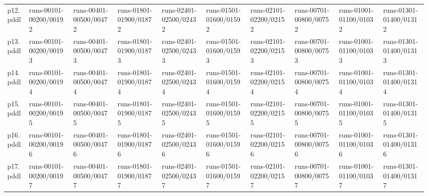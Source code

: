 \documentclass{article}
\begin{document}
\begin{tabular}{@{}lrrrrrrrrr@{}}
p12.pddl & \multicolumn{1}{|l|}{runs-00101-00200/00192} & \multicolumn{1}{|l|}{runs-00401-00500/00472} & \multicolumn{1}{|l|}{runs-01801-01900/01872} & \multicolumn{1}{|l|}{runs-02401-02500/02432} & \multicolumn{1}{|l|}{runs-01501-01600/01592} & \multicolumn{1}{|l|}{runs-02101-02200/02152} & \multicolumn{1}{|l|}{runs-00701-00800/00752} & \multicolumn{1}{|l|}{runs-01001-01100/01032} & \multicolumn{1}{|l|}{runs-01301-01400/01312} \\
p13.pddl & \multicolumn{1}{|l|}{runs-00101-00200/00193} & \multicolumn{1}{|l|}{runs-00401-00500/00473} & \multicolumn{1}{|l|}{runs-01801-01900/01873} & \multicolumn{1}{|l|}{runs-02401-02500/02433} & \multicolumn{1}{|l|}{runs-01501-01600/01593} & \multicolumn{1}{|l|}{runs-02101-02200/02153} & \multicolumn{1}{|l|}{runs-00701-00800/00753} & \multicolumn{1}{|l|}{runs-01001-01100/01033} & \multicolumn{1}{|l|}{runs-01301-01400/01313} \\
p14.pddl & \multicolumn{1}{|l|}{runs-00101-00200/00194} & \multicolumn{1}{|l|}{runs-00401-00500/00474} & \multicolumn{1}{|l|}{runs-01801-01900/01874} & \multicolumn{1}{|l|}{runs-02401-02500/02434} & \multicolumn{1}{|l|}{runs-01501-01600/01594} & \multicolumn{1}{|l|}{runs-02101-02200/02154} & \multicolumn{1}{|l|}{runs-00701-00800/00754} & \multicolumn{1}{|l|}{runs-01001-01100/01034} & \multicolumn{1}{|l|}{runs-01301-01400/01314} \\
p15.pddl & \multicolumn{1}{|l|}{runs-00101-00200/00195} & \multicolumn{1}{|l|}{runs-00401-00500/00475} & \multicolumn{1}{|l|}{runs-01801-01900/01875} & \multicolumn{1}{|l|}{runs-02401-02500/02435} & \multicolumn{1}{|l|}{runs-01501-01600/01595} & \multicolumn{1}{|l|}{runs-02101-02200/02155} & \multicolumn{1}{|l|}{runs-00701-00800/00755} & \multicolumn{1}{|l|}{runs-01001-01100/01035} & \multicolumn{1}{|l|}{runs-01301-01400/01315} \\
p16.pddl & \multicolumn{1}{|l|}{runs-00101-00200/00196} & \multicolumn{1}{|l|}{runs-00401-00500/00476} & \multicolumn{1}{|l|}{runs-01801-01900/01876} & \multicolumn{1}{|l|}{runs-02401-02500/02436} & \multicolumn{1}{|l|}{runs-01501-01600/01596} & \multicolumn{1}{|l|}{runs-02101-02200/02156} & \multicolumn{1}{|l|}{runs-00701-00800/00756} & \multicolumn{1}{|l|}{runs-01001-01100/01036} & \multicolumn{1}{|l|}{runs-01301-01400/01316} \\
p17.pddl & \multicolumn{1}{|l|}{runs-00101-00200/00197} & \multicolumn{1}{|l|}{runs-00401-00500/00477} & \multicolumn{1}{|l|}{runs-01801-01900/01877} & \multicolumn{1}{|l|}{runs-02401-02500/02437} & \multicolumn{1}{|l|}{runs-01501-01600/01597} & \multicolumn{1}{|l|}{runs-02101-02200/02157} & \multicolumn{1}{|l|}{runs-00701-00800/00757} & \multicolumn{1}{|l|}{runs-01001-01100/01037} & \multicolumn{1}{|l|}{runs-01301-01400/01317} \\

\end{tabular}
\end{document}

